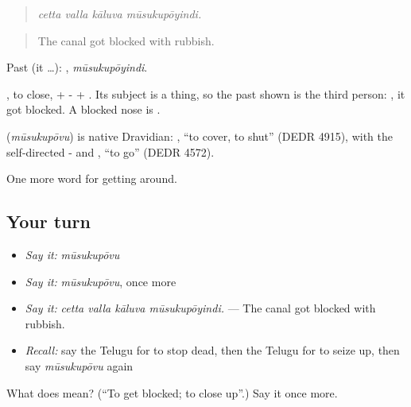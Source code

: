 \begin{quote}
\emph{cetta valla kāluva mūsukupōyindi.}
\end{quote}

\begin{quote}
The canal got blocked with rubbish.
\end{quote}

Past (it …): , \emph{mūsukupōyindi}.

, to close, + - + . Its subject is a thing, so the past shown is the third person: , it got blocked. A blocked nose is  .

\begin{cousinweb}
\textbf{} (\emph{mūsukupōvu}) is native Dravidian: , \textquotedblleft{}to cover, to shut\textquotedblright{} (DEDR 4915), with the self-directed - and , \textquotedblleft{}to go\textquotedblright{} (DEDR 4572).
\end{cousinweb}

\begin{grammarlens}[title={What you've built}]
One more word for getting around.
\end{grammarlens}

\subsection*{Your turn}
\begin{itemize}
\raggedright
  \item \emph{Say it:} \emph{mūsukupōvu}
  \item \emph{Say it:} \emph{mūsukupōvu}, once more
  \item \emph{Say it:} \emph{cetta valla kāluva mūsukupōyindi.} — The canal got blocked with rubbish.
  \item \emph{Recall:} say the Telugu for to stop dead, then the Telugu for to seize up, then say \emph{mūsukupōvu} again
\end{itemize}

\begin{tcolorbox}[breakable,colback=teal!4,colframe=teal!35!black,title={Before you move on}]
What does  mean? (\textquotedblleft{}To get blocked; to close up\textquotedblright{}.) Say it once more.
\end{tcolorbox}
